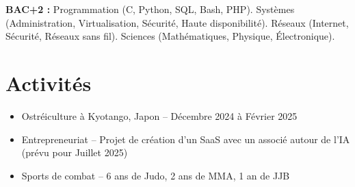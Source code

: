 \documentclass{article}
\begin{document}
\textbf{BAC+2 :} Programmation (C, Python, SQL, Bash, PHP). Systèmes (Administration, Virtualisation, Sécurité, Haute disponibilité). Réseaux (Internet, Sécurité, Réseaux sans fil). Sciences (Mathématiques, Physique, Électronique).



\vspace{2ex}
\hrulefill

\section*{Activités}
\begin{itemize}
  \item Ostréiculture à Kyotango, Japon – Décembre 2024 à Février 2025
  \item Entrepreneuriat – Projet de création d'un SaaS avec un associé autour de l'IA (prévu pour Juillet 2025)
  \item Sports de combat – 6 ans de Judo, 2 ans de MMA, 1 an de JJB
\end{itemize}
\end{document}
